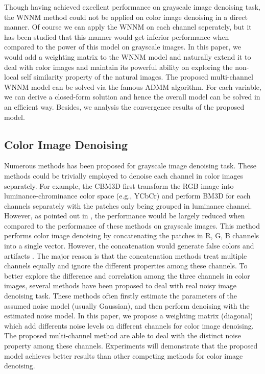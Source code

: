 \documentclass[10pt,twocolumn,letterpaper]{article}
\begin{document}
Though having achieved excellent performance on grayscale image denoising task, the WNNM method could not be applied on color image denoising in a direct manner. Of course we can apply the WNNM on each channel seperately, but it has been studied that this manner would get inferior performance when compared to the power of this model on grayscale images. In this paper, we would add a weighting matrix to the WNNM model and naturally extend it to deal with color images and maintain its powerful ability on exploring the non-local self similarity property of the natural images. The proposed multi-channel WNNM model can be solved via the famous ADMM \cite{admm} algorithm. For each variable, we can derive a closed-form solution and hence the overall model can be solved in an efficient way. Besides, we analysis the convergence results of the proposed model.

\subsection{Color Image Denoising}
Numerous methods \cite{nlm,ksvd,bm3d,epll,lssc,wnnm,pgpd,mlp,csf,chen2015learning} has been proposed for grayscale image denoising task. These methods could be trivially employed to denoise each channel in color images separately. For example, the CBM3D \cite{cbm3d} first transform the RGB image into luminance-chrominance color space (e.g., YCbCr) and perform BM3D \cite{bm3d} for each channels separately with the patches only being grouped in luminance channel. However, as pointed out in \cite{mairal2008sparse}, the performance would be largely reduced when compared to the performance of these methods on grayscale images. 
This method \cite{mairal2008sparse} performs color image denoising by concatenating the patches in R, G, B channels into a single vector. However, the concatenation would generate false colors and artifacts \cite{mairal2008sparse}. The major reason is that the concatenation methods treat multiple channels equally and ignore the different properties among these channels. To better explore the difference and correlation among the three channels in color images, several methods \cite{crosschannel2016,Liu2008,almapg,Zhu_2016_CVPR,noiseclinic,ncwebsite,neatimage} have been proposed to deal with real noisy image denoising task. These methods often firstly estimate the parameters of the assumed noise model (usually Gaussian), and then perform denoising with the estimated noise model. In this paper, we propose a weighting matrix (diagonal) which add differents noise levels on different channels for color image denoising. The proposed multi-channel method are able to deal with the distinct noise property among these channels. Experiments will demonstrate that the proposed model achieves better results than other competing methods for color image denoising.
\end{document}
